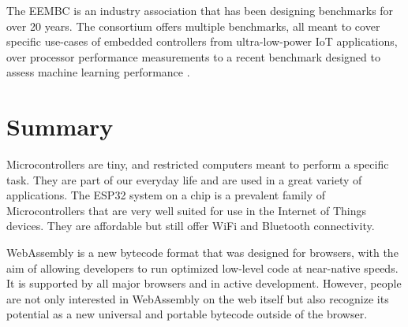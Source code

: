 The EEMBC is an industry association that has been designing benchmarks for over 20 years. The consortium offers multiple benchmarks, all meant to cover specific use-cases of embedded controllers from ultra-low-power IoT applications, over processor performance measurements to a recent benchmark designed to assess machine learning performance \autocite{noauthor_benchmark_nodate}.

\section{Summary}
Microcontrollers are tiny, and restricted computers meant to perform a specific task. They are part of our everyday life and are used in a great variety of applications. The ESP32 system on a chip is a prevalent family of Microcontrollers that are very well suited for use in the Internet of Things devices. They are affordable but still offer WiFi and Bluetooth connectivity.

WebAssembly is a new bytecode format that was designed for browsers, with the aim of allowing developers to run optimized low-level code at near-native speeds. It is supported by all major browsers and in active development. However, people are not only interested in WebAssembly on the web itself but also recognize its potential as a new universal and portable bytecode outside of the browser.